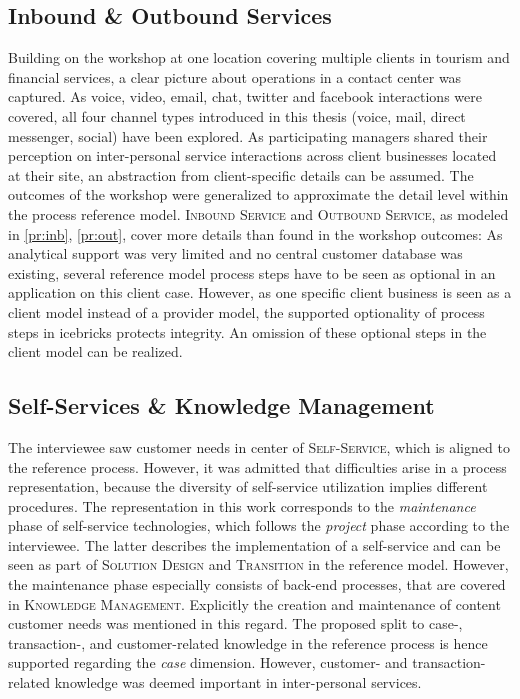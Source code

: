 		\subsection{Inbound \& Outbound Services}
	Building on the workshop at one location covering multiple clients in tourism and financial services, a clear picture about operations in a contact center was captured. 
	As voice, video, email, chat, twitter and facebook interactions were covered, all four channel types introduced in this thesis (voice, mail, direct messenger, social) have been explored. As participating managers shared their perception on inter-personal service interactions across client businesses located at their site, an abstraction from client-specific details can be assumed. The outcomes of the workshop were generalized to approximate the detail level within the process reference model. \textsc{Inbound Service} and \textsc{Outbound Service}, as modeled in \ref{pr:inb}, \ref{pr:out}, cover more details than found in the workshop outcomes: As analytical support was very limited and no central customer database was existing, several reference model process steps have to be seen as optional in an application on this client case. However, as one specific client business is seen as a client model instead of a provider model, the supported optionality of process steps in icebricks protects integrity. An omission of these optional steps in the client model can be realized.
	
	\subsection{Self-Services \& Knowledge Management}
	The interviewee saw customer needs in center of \textsc{Self-Service}, which is aligned to the reference process. However, it was admitted that difficulties arise in a process representation, because the diversity of self-service utilization implies different procedures. The representation in this work corresponds to the \textit{maintenance} phase of self-service technologies, which follows the \textit{project} phase according to the interviewee. The latter describes the implementation of a self-service and can be seen as part of \textsc{Solution Design} and \textsc{Transition} in the reference model. However, the maintenance phase especially consists of back-end processes, that are covered in \textsc{Knowledge Management}. Explicitly the creation and maintenance of content \wrt customer needs was mentioned in this regard. The proposed split to case-, transaction-, and customer-related knowledge  in the reference process is hence supported regarding the \textit{case} dimension. However, customer- and transaction-related knowledge was deemed important in inter-personal services. 
	
